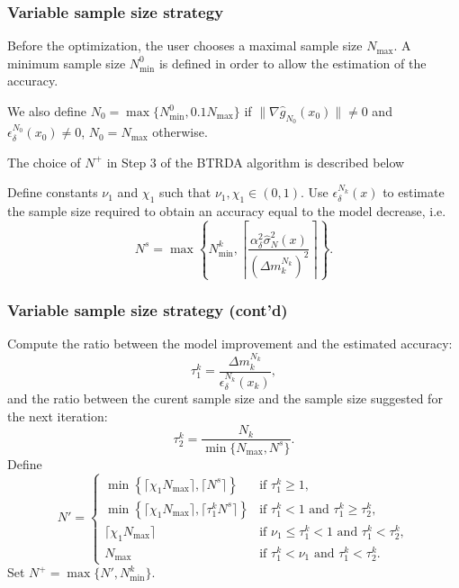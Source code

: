\documentclass{beamer}
\begin{document}
\begin{frame}
\frametitle{Variable sample size strategy}										

Before the optimization, the user chooses a maximal sample size $N_{\max}$.
A minimum sample size $N^0_{\min}$ is defined in order to allow the estimation of the accuracy.

\mbox{}

We also define $N_0 = \max\lbrace N^0_{\min}, 0.1N_{\max}\rbrace$ if $\| \nabla \hat{g}_{N_0}(x_0) \| \ne 0$ and $\epsilon_{\delta}^{N_0}(x_0) \ne 0$, $N_0 = N_{\max}$ otherwise.

\mbox{}

The choice of $N^+$ in Step 3 of the BTRDA algorithm is described below

\mbox{}

Define constants $\nu_1$ and $\chi_1$ such that $\nu_1, \chi_1 \in (0,1)$.
Use $\epsilon_{\delta}^{N_k}(x)$ to estimate the sample size required to obtain an accuracy equal to the model decrease, i.e.
\[
N^s = \max \left\lbrace N^k_{\min},
\left\lceil
\frac{\alpha^2_{\delta}  \hat{\sigma}^2_N(x)}{(\Delta m_k^{N_k})^2}
\right\rceil \right\rbrace.
\]

\end{frame}

\begin{frame}
\frametitle{Variable sample size strategy (cont'd)}

Compute the ratio between the model improvement and the estimated accuracy:
\[
\tau_1^k = \frac{\Delta m_k^{N_k}}{\epsilon_\delta^{N_k} (x_k)},
\]
and the ratio between the curent sample size and the sample size suggested for the next iteration:\[
\tau_2^k = \frac{N_k}{\min \lbrace N_{\max}, N^s \rbrace}.
\]
Define
\[
N' =
\begin{cases}
 \min \left\lbrace \lceil \chi_1 N_{\max} \rceil, \lceil N^s
 \rceil \right\rbrace & \text{if } \tau_1^k \geq 1, \\
 \min \left\lbrace \lceil \chi_1 N_{\max} \rceil, \lceil \tau_1^kN^s
 \rceil  \right\rbrace &  \text{if } \tau_1^k < 1 \text{ and }
 \tau_1^k \geq  \tau_2^k,\\
 \lceil \chi_1 N_{\max} \rceil & \text{if }  \nu_1 \leq \tau_1^k <
 1\text{ and }\tau_1^k < \tau_2^k,\\
 N_{\max} & \text{if } \tau_1^k < \nu_1\text{ and }\tau_1^k < \tau_2^k.
\end{cases}
\]
Set $N^+ = \max\lbrace N', N^k_{\min}\rbrace$.

\end{frame}
\end{document}
